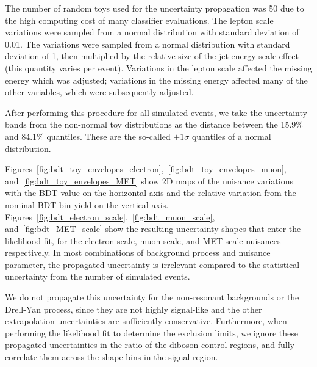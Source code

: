 The number of random toys used for the uncertainty propagation was 50 due to the high computing cost of many classifier evaluations. 
The lepton scale variations were sampled from a normal distribution with standard deviation of 0.01.
The \met variations were sampled from a normal distribution with standard deviation of 1, then multiplied by the relative size of the jet energy scale effect (this quantity varies per event).
Variations in the lepton scale affected the missing energy which was adjusted; variations in the missing energy affected many of the other variables, which were subsequently adjusted. 

After performing this procedure for all simulated events, we take the uncertainty bands from the non-normal toy distributions as the distance between the 15.9\% and 84.1\% quantiles.
These are the so-called $\pm1\sigma$ quantiles of a normal distribution.

Figures~\ref{fig:bdt_toy_envelopes_electron},~\ref{fig:bdt_toy_envelopes_muon}, and~\ref{fig:bdt_toy_envelopes_MET} show 2D maps of the nuisance variations with the BDT value on the horizontal axis and the relative variation from the nominal BDT bin yield on the vertical axis.
Figures~\ref{fig:bdt_electron_scale},~\ref{fig:bdt_muon_scale}, and~\ref{fig:bdt_MET_scale} show the resulting uncertainty shapes that enter the likelihood fit, for the electron scale, muon scale, and MET scale nuisances respectively. 
In most combinations of background process and nuisance parameter, the propagated uncertainty is irrelevant compared to the statistical uncertainty from the number of simulated events.

We do not propagate this uncertainty for the non-resonant backgrounds or the Drell-Yan process, 
since they are not highly signal-like and the other extrapolation uncertainties are sufficiently conservative.
Furthermore, when performing the likelihood fit to determine the exclusion limits, 
we ignore these propagated uncertainties in the ratio of the diboson control regions, 
and fully correlate them across the shape bins in the signal region. 

